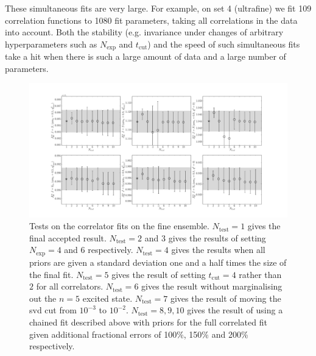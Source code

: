 These simultaneous fits are very large. For example, on set 4 (ultrafine) we fit 109 correlation functions to 1080 fit parameters, taking all correlations in the data into account. Both the stability (e.g. invariance under changes of arbitrary hyperparameters such as $N_{\text{exp}}$ and $t_{\text{cut}}$) and the speed of such simultaneous fits take a hit when there is such a large amount of data and a large number of parameters.

\begin{figure}
    \hspace{-85pt}
    \includegraphics[width=1.4\textwidth]{images/BsDs/finecorr_fittest.pdf}
    \caption{Tests on the correlator fits on the fine ensemble. $N_{\text{test}}=1$ gives the final accepted result. $N_{\text{test}}=2$ and $3$ gives the results of setting $N_{\text{exp}}=4$ and $6$ respectively. $N_{\text{test}}=4$ gives the results when all priors are given a standard deviation one and a half times the size of the final fit. $N_{\text{test}}=5$ gives the result of setting $t_{\text{cut}}=4$ rather than $2$ for all correlators. $N_{\text{test}}=6$ gives the result without marginalising out the $n=5$ excited state. $N_{\text{test}}=7$ gives the result of moving the svd cut from $10^{-3}$ to $10^{-2}$. $N_{\text{test}}=8,9,10$ gives the result of using a chained fit described above with priors for the full correlated fit given additional fractional errors of 100\%, 150\% and 200\% respectively. \label{fig:corr_tests_BsDs}}
\end{figure}


